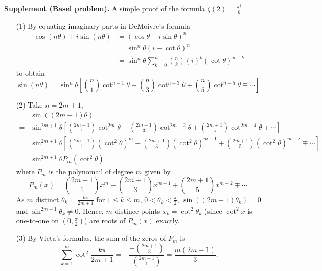 \documentclass{article}
\begin{document}
\textbf{Supplement (Basel problem).}
A simple proof of the formula $\zeta(2) = \frac{\pi^2}{6}$.
\begin{enumerate}
  \item[(1)]
    By equating imaginary parts in DeMoivre's formula
    \begin{align*}
      \cos(n\theta) + i \sin(n\theta)
      &= (\cos \theta + i \sin \theta)^n \\
      &= \sin^n \theta (i + \cot \theta)^n \\
      &= \sin^n \theta \sum_{k=0}^{n} {n \choose k} (i)^k (\cot \theta)^{n-k}
    \end{align*}
    to obtain
    \[
      \sin(n\theta)
      = \sin^n \theta
        \left[
          {n \choose 1} \cot^{n-1} \theta
          - {n \choose 3} \cot^{n-3} \theta
          + {n \choose 5} \cot^{n-5} \theta
          \mp \cdots
        \right].
    \]
  \item[(2)]
    Take $n = 2m+1$,
    \begin{align*}
      &\sin((2m+1)\theta) \\
      =& \sin^{2m+1} \theta
        \left[
          {2m+1 \choose 1} \cot^{2m} \theta
          - {2m+1 \choose 3} \cot^{2m-2} \theta
          + {2m+1 \choose 5} \cot^{2m-4} \theta
          \mp \cdots
        \right] \\
      =& \sin^{2m+1} \theta
        \left[
          {2m+1 \choose 1} (\cot^{2}\theta)^m
          - {2m+1 \choose 3} (\cot^{2}\theta)^{m-1}
          + {2m+1 \choose 5} (\cot^{2}\theta)^{m-2}
          \mp \cdots
        \right] \\
      =& \sin^{2m+1} \theta P_m(\cot^{2}\theta)
    \end{align*}
    where $P_m$ is the polynomail of degree $m$ given by
    \[
      P_m(x) = {2m+1 \choose 1} x^m
          - {2m+1 \choose 3} x^{m-1}
          + {2m+1 \choose 5} x^{m-2}
          \mp \cdots.
    \]
    As $m$ distinct $\theta_k = \frac{k\pi}{2m+1}$ for $1 \leq k \leq m$,
    $0 < \theta_k < \frac{\pi}{2}$, $\sin((2m+1)\theta_k) = 0$
    and $\sin^{2m+1} \theta_k \neq 0$.
    Hence, $m$ distince points $x_k = \cot^2 \theta_k$
    (since $\cot^2 x$ is one-to-one on $(0,\frac{\pi}{2})$)
    are roots of $P_m(x)$ exactly.

  \item[(3)]
    By Vieta's formulas,
    the sum of the zeros of $P_m$ is
    \[
      \sum_{k=1}^m \cot^2 \frac{k\pi}{2m+1}
      = -\frac{-{2m+1 \choose 3}}{{2m+1 \choose 1}}
      = \frac{m(2m-1)}{3}.
    \]


\end{enumerate}
\end{document}
